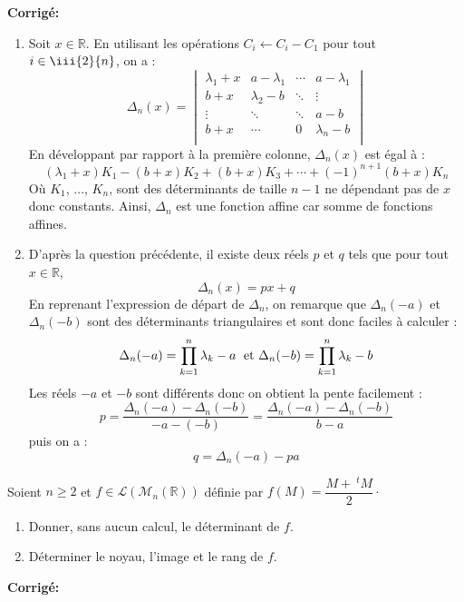 \documentclass[a4paper,twoside,french,11pt]{VcCours}
\newcommand{\corr}{\textbf{Corrigé:}}
\begin{document}
\corr 

\begin{enumerate}
\item Soit $x \in \mathbb{R}$. En utilisant les opérations $C_i \leftarrow C_i - C_1$ pour tout $i \in \iii{2}{n}$, on a :
    \[
    \Delta_n(x) =
    \begin{vmatrix}
        {\lambda_1 + x} & a - \lambda_1 & \cdots & a- \lambda_1 \\
        {b + x} & \lambda_2-b & \ddots & \vdots \\
        \vdots & \ddots & \ddots & a-b \\
        {b + x} & \cdots & 0 & \lambda_n-b \\
    \end{vmatrix}    
    \]
En développant par rapport à la première colonne, $\Delta_n(x)$ est égal à :
$$ (\lambda_1+x) K_1 - (b+x) K_2 + (b+x) K_3 + \cdots + (-1)^{n+1} (b+x) K_n$$
Où $K_1$, $\ldots$, $K_n$, sont des déterminants de taille $n-1$ ne dépendant pas de $x$ donc constants. Ainsi, $\Delta_n$ est une fonction affine car somme de fonctions affines.
\item D'après la question précédente, il existe deux réels $p$ et $q$ tels que pour tout $x \in \mathbb{R}$,
$$ \Delta_n(x) = px + q$$
En reprenant l'expression de départ de $\Delta_n$, on remarque que $\Delta_n(-a)$ et $\Delta_n(-b)$ sont des déterminants triangulaires et sont donc faciles à calculer :
$$ \Delta_n(-a) = \prod_{k=1}^n \lambda_k - a \; \hbox{ et } \Delta_n(-b) = \prod_{k=1}^n \lambda_k - b$$
Les réels $-a$ et $-b$ sont différents donc on obtient la pente facilement :
$$ p = \dfrac{\Delta_n(-a) - \Delta_n(-b)}{-a-(-b)} = \dfrac{\Delta_n(-a) - \Delta_n(-b)}{b-a}$$
puis on a :
$$ q = \Delta_n(-a) -pa$$
\end{enumerate}



\begin{Exercice}{} Soient $n \geq 2$ et $f \in \mathcal{L}(\mathcal{M}_n(\mathbb{R}))$ définie par $f(M) = \dfrac{M+~^tM}{2}\cdot$

\begin{enumerate}
\item Donner, sans aucun calcul, le déterminant de $f$.
\item Déterminer le noyau, l'image et le rang de $f$. 
\end{enumerate}
\end{Exercice}

\corr
\end{document}
